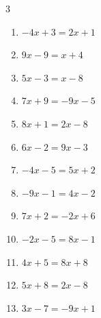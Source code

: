 \begin{multicols}{3}
\begin{enumerate}

  \item $-4x+3=2x+1$


  \item $9x-9=x+4$


  \item $5x-3=x-8$


  \item $7x+9=-9x-5$


  \item $8x+1=2x-8$


  \item $6x-2=9x-3$


  \item $-4x-5=5x+2$


  \item $-9x-1=4x-2$


\columnbreak %

  \item $7x+2=-2x+6$


  \item $-2x-5=8x-1$


  \item $4x+5=8x+8$


  \item $5x+8=2x-8$


  \item $3x-7=-9x+1$



\end{enumerate}
\end{multicols}
